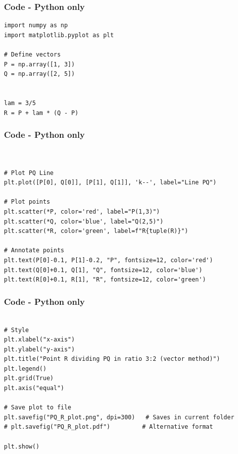 \documentclass{beamer}
\theoremstyle{remark}
\numberwithin{equation}{section}
\begin{document}
\begin{frame}[fragile]
\frametitle{Code - Python only}
\begin{lstlisting}
import numpy as np
import matplotlib.pyplot as plt

# Define vectors
P = np.array([1, 3])
Q = np.array([2, 5])


lam = 3/5
R = P + lam * (Q - P)

\end{lstlisting}
\end{frame}
\begin{frame}[fragile]
\frametitle{Code - Python only}
\begin{lstlisting}


# Plot PQ Line
plt.plot([P[0], Q[0]], [P[1], Q[1]], 'k--', label="Line PQ")

# Plot points
plt.scatter(*P, color='red', label="P(1,3)")
plt.scatter(*Q, color='blue', label="Q(2,5)")
plt.scatter(*R, color='green', label=f"R{tuple(R)}")

# Annotate points
plt.text(P[0]-0.1, P[1]-0.2, "P", fontsize=12, color='red')
plt.text(Q[0]+0.1, Q[1], "Q", fontsize=12, color='blue')
plt.text(R[0]+0.1, R[1], "R", fontsize=12, color='green')

\end{lstlisting}
\end{frame}
\begin{frame}[fragile]
\frametitle{Code - Python only}
\begin{lstlisting}

# Style
plt.xlabel("x-axis")
plt.ylabel("y-axis")
plt.title("Point R dividing PQ in ratio 3:2 (vector method)")
plt.legend()
plt.grid(True)
plt.axis("equal")

# Save plot to file
plt.savefig("PQ_R_plot.png", dpi=300)   # Saves in current folder
# plt.savefig("PQ_R_plot.pdf")         # Alternative format

plt.show()




    \end{lstlisting}
\end{frame}
\end{document}
